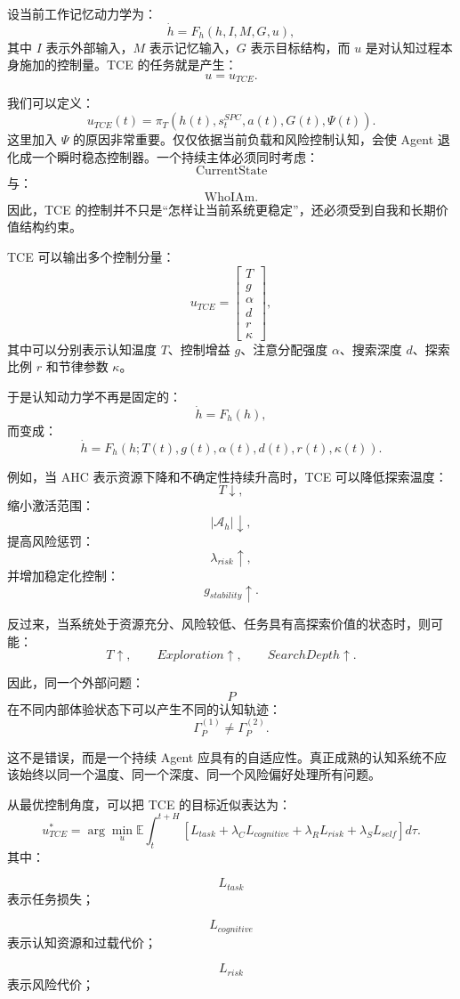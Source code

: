 设当前工作记忆动力学为：
\[
\dot h
=
F_h(h,I,M,G,u),
\]
其中 $I$ 表示外部输入，$M$ 表示记忆输入，$G$ 表示目标结构，而 $u$ 是对认知过程本身施加的控制量。TCE 的任务就是产生：
\[
u=u_{TCE}.
\]

我们可以定义：
\[
\boxed{
u_{TCE}(t)
=
\pi_T
\left(
h(t),
s_t^{SPC},
a(t),
G(t),
\Psi(t)
\right).
}
\]
这里加入 $\Psi$ 的原因非常重要。仅仅依据当前负载和风险控制认知，会使 Agent 退化成一个瞬时稳态控制器。一个持续主体必须同时考虑：
\[
\text{CurrentState}
\]
与：
\[
\text{WhoIAm}.
\]
因此，TCE 的控制并不只是``怎样让当前系统更稳定''，还必须受到自我和长期价值结构约束。

TCE 可以输出多个控制分量：
\[
u_{TCE}
=
\begin{bmatrix}
T\\
g\\
\alpha\\
d\\
r\\
\kappa
\end{bmatrix},
\]
其中可以分别表示认知温度 $T$、控制增益 $g$、注意分配强度 $\alpha$、搜索深度 $d$、探索比例 $r$ 和节律参数 $\kappa$。

于是认知动力学不再是固定的：
\[
\dot h=F_h(h),
\]
而变成：
\[
\boxed{
\dot h
=
F_h
\left(
h;
T(t),
g(t),
\alpha(t),
d(t),
r(t),
\kappa(t)
\right).
}
\]

例如，当 AHC 表示资源下降和不确定性持续升高时，TCE 可以降低探索温度：
\[
T\downarrow,
\]
缩小激活范围：
\[
|\mathcal A_h|\downarrow,
\]
提高风险惩罚：
\[
\lambda_{risk}\uparrow,
\]
并增加稳定化控制：
\[
g_{stability}\uparrow.
\]

反过来，当系统处于资源充分、风险较低、任务具有高探索价值的状态时，则可能：
\[
T\uparrow,\qquad
Exploration\uparrow,\qquad
SearchDepth\uparrow.
\]

因此，同一个外部问题：
\[
P
\]
在不同内部体验状态下可以产生不同的认知轨迹：
\[
\Gamma_P^{(1)}
\neq
\Gamma_P^{(2)}.
\]

这不是错误，而是一个持续 Agent 应具有的自适应性。真正成熟的认知系统不应该始终以同一个温度、同一个深度、同一个风险偏好处理所有问题。

从最优控制角度，可以把 TCE 的目标近似表达为：
\[
u_{TCE}^{*}
=
\arg\min_u
\mathbb E
\int_{t}^{t+H}
\left[
L_{task}
+
\lambda_C L_{cognitive}
+
\lambda_R L_{risk}
+
\lambda_S L_{self}
\right]
d\tau.
\]
其中：

\[
L_{task}
\]
表示任务损失；

\[
L_{cognitive}
\]
表示认知资源和过载代价；

\[
L_{risk}
\]
表示风险代价；

